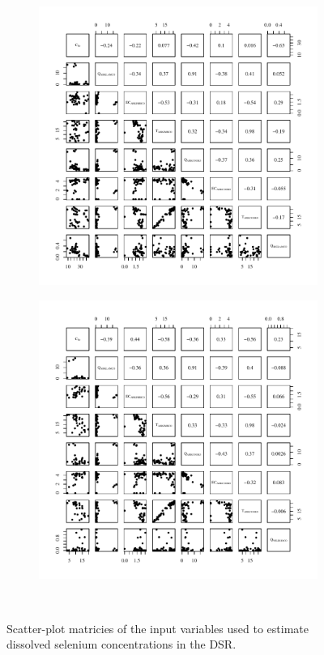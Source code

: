 \subfiguremid
\begin{landscape}
	\begin{figure}
		\begin{subfigure}{0.7\textwidth}
			\centering
			\includegraphics[width=\tableCustomSize]{"Figures/Results_DSR/Stochastic/Conc Model Full PairsBIG"}
		\end{subfigure}%
		\begin{subfigure}{0.7\textwidth}
			\centering			
			\includegraphics[width=\tableCustomSize]{"Figures/Results_DSR/Stochastic/Conc Model Full PairsWIL"}
		\end{subfigure}\\
		\caption{Scatter-plot matricies of the input variables used to estimate dissolved selenium concentrations in the DSR.}
	\end{figure}
\end{landscape}

